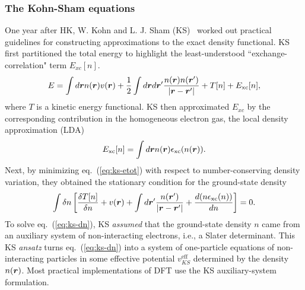 \subsubsection{The Kohn-Sham equations}

One year after HK, W. Kohn and L. J. Sham (KS)~\cite{Kohn1965} worked out practical guidelines for constructing approximations to the exact density functional. KS first partitioned the total energy to highlight the least-understood ``exchange-correlation" term $E_{xc}[n]$.
\begin{align} \label{eq:ks-etot}
E=\int d\boldsymbol{r} n(\boldsymbol{r}) v(\boldsymbol{r}) + \frac{1}{2}\int d\boldsymbol{r}d\boldsymbol{r}' \dfrac{n(\boldsymbol{r})n(\boldsymbol{r}')}{\vert\boldsymbol{r}-\boldsymbol{r}'\vert} + T[n] + E_{\text{xc}}[n],
\end{align}
where $T$ is a kinetic energy functional. KS then approximated $E_{xc}$ by the corresponding contribution in the homogeneous electron gas, the local density approximation (LDA)
\begin{align}
E_{\text{xc}}[n] = \int d\boldsymbol{r}n(\boldsymbol{r})\epsilon_{\text{xc}}(n(\boldsymbol{r})).
\end{align}
Next, by minimizing eq.~(\ref{eq:ks-etot}) with respect to number-conserving density variation, they obtained the stationary condition for the ground-state density
\begin{align}
\int \delta n \left[
\dfrac{\delta T[n]}{\delta n}+
v(\boldsymbol{r}) + \int d\boldsymbol{r}' \dfrac{n(\boldsymbol{r}')}{\vert\boldsymbol{r}-\boldsymbol{r}'\vert}+
\dfrac{d(n\epsilon_{\text{xc}}(n))}{dn}
\right] = 0. \label{eq:ks-dn}
\end{align}
To solve eq.~(\ref{eq:ks-dn}), KS \textit{assumed} that the ground-state density $n$ came from an auxiliary system of non-interacting electrons, i.e., a Slater determinant. This KS \textit{ansatz} turns eq.~(\ref{eq:ks-dn}) into a system of one-particle equations of non-interacting particles in some effective potential $v^{\text{eff}}_{KS}$ determined by the density $n(\boldsymbol{r})$. Most practical implementations of DFT use the KS auxiliary-system formulation.

